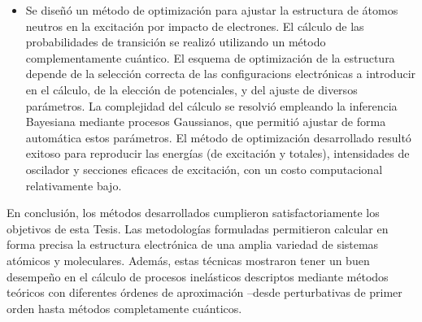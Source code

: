 \begin{itemize}
\item
Se diseñó un método de optimización para ajustar la estructura de 
átomos neutros en la excitación por impacto de electrones. El cálculo 
de las probabilidades de transición se realizó utilizando un método 
complementamente cuántico. El esquema de optimización de la estructura 
depende de la selección correcta de las configuracions electrónicas a 
introducir en el cálculo, de la elección de potenciales, y del ajuste 
de diversos parámetros. La complejidad del cálculo se resolvió empleando 
la inferencia Bayesiana mediante procesos Gaussianos, que permitió 
ajustar de forma automática estos parámetros. El método de 
optimización desarrollado resultó exitoso para reproducir las energías 
(de excitación y totales), intensidades de oscilador y secciones 
eficaces de excitación, con un costo computacional relativamente bajo.
\end{itemize}
%
En conclusión, los métodos desarrollados cumplieron satisfactoriamente 
los objetivos de esta Tesis. Las metodologías formuladas permitieron 
calcular en forma precisa la estructura electrónica de una amplia 
variedad de sistemas atómicos y moleculares. Además, estas técnicas 
mostraron tener
un buen desempeño en el cálculo de procesos inelásticos descriptos 
mediante métodos teóricos con diferentes órdenes de aproximación --desde 
perturbativas de primer orden hasta métodos completamente cuánticos. 


